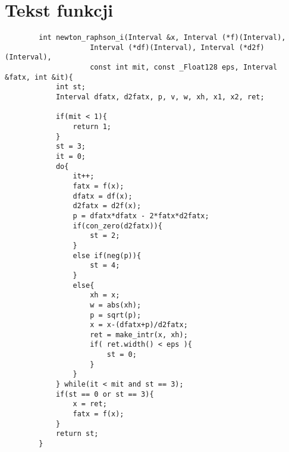 \documentclass[11pt]{article}
\begin{document}
\section{Tekst funkcji}
    \begin{verbatim}
        int newton_raphson_i(Interval &x, Interval (*f)(Interval), 
                    Interval (*df)(Interval), Interval (*d2f)(Interval),
                    const int mit, const _Float128 eps, Interval &fatx, int &it){
            int st;
            Interval dfatx, d2fatx, p, v, w, xh, x1, x2, ret;

            if(mit < 1){
                return 1;
            }
            st = 3;
            it = 0;
            do{
                it++;
                fatx = f(x);
                dfatx = df(x);
                d2fatx = d2f(x);
                p = dfatx*dfatx - 2*fatx*d2fatx;
                if(con_zero(d2fatx)){
                    st = 2;
                }
                else if(neg(p)){
                    st = 4;
                }
                else{
                    xh = x;
                    w = abs(xh);
                    p = sqrt(p);
                    x = x-(dfatx+p)/d2fatx;
                    ret = make_intr(x, xh);
                    if( ret.width() < eps ){
                        st = 0;
                    }
                }
            } while(it < mit and st == 3);
            if(st == 0 or st == 3){
                x = ret;
                fatx = f(x);
            }
            return st;
        } 
    \end{verbatim}

\pagebreak
\end{document}
